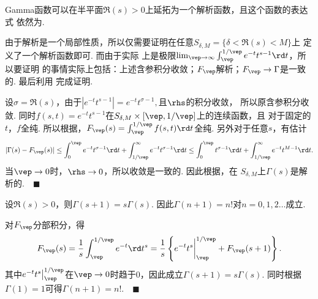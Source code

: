   \begin{thm}[Gamma函数]
    Gamma函数可以在半平面$\Re(s)>0$上延拓为一个解析函数，且这个函数的表达式
    依然为.
  \end{thm}
  \proof
    由于解析是一个局部性质，所以仅需要证明在任意$S_{\delta,M}=\{\delta<\Re(s)<M\}$上
    定义了一个解析函数即可. 而由于实际
    上是极限$\lim_{\vep\to\infty}\int_{\vep}^{1/\vep}e^{-t}t^{s-1}\rd t$，所以要证明
    的事情实际上包括：上述含参积分收敛；$F_\vep$解析；$F_\vep\to \Gamma$是一致的. 最后利用
    完成证明.\par
    设$\sigma=\Re(s)$，由于$|e^{-t}t^{s-1}| = e^{-t}t^{\sigma-1},$且$\rhs$的积分收敛，
    所以原含参积分收敛. 
    同时$f(s,t)=e^{-t}t^{s-1}$在$S_{\delta,M}\times[\vep,1/\vep]$上的连续函数，且
    对于固定的$t$，$f$全纯. 所以根据，$F_\vep(s)=
    \int_{\vep}^{1/\vep}f(s,t)\rd t$全纯. 另外对于任意$s$，有估计
    \[
      |\Gamma(s)-F_\vep(s)|
      \le \int_0^\vep e^{-t}t^{\sigma-1}\rd t 
      + \int_{1/\vep}^\infty e^{-t}t^{\sigma-1}\rd t
      \le \int_0^\vep t^{\sigma-1}\rd t + \int_{1/\vep}^\infty e^{-t}t^{M-1}\rd t.
    \]
    当$\vep\to 0$时，$\rhs\to 0$，所以收敛是一致的. 因此根据，在
    $S_{\delta,M}$上$\Gamma(s)$是解析的.$\quad\blacksquare$

  \begin{lemma}[准周期性]
    \label{lemma: Gamma的准周期性}
    设$\Re(s)>0$，则$\Gamma(s+1)=s\Gamma(s)$. 因此$\Gamma(n+1)=n!$对$n=0,1,2\dots$成立.
  \end{lemma}
  \proof
    对$F_\vep$分部积分，得
    \[\begin{split}
      F_\vep(s) = \frac{1}{s}\int_{\vep}^{1/\vep}e^{-t}\rd t^s 
      = \frac{1}{s}\left\{ e^{-t}t^s\bigg|_{\vep}^{1/\vep} + F_\vep(s+1) \right\}.
    \end{split}\]
    其中$e^{-t}t^s\big|_{\vep}^{1/\vep}$在$\vep\to0$时趋于$0$，因此成立$\Gamma(s+1)=
    s\Gamma(s)$. 同时根据$\Gamma(1)=1$可得$\Gamma(n+1)=n!$.$\quad\blacksquare$


